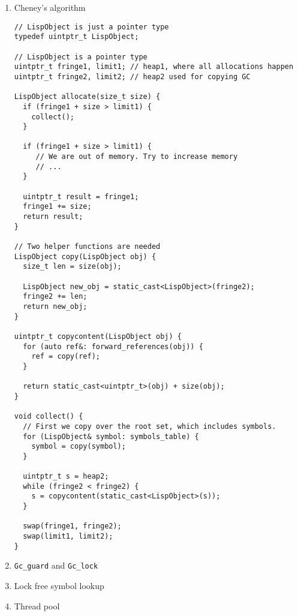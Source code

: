 \begin{enumerate}
\item Cheney's algorithm
\label{sec:org9d148aa}

\begin{verbatim}
// LispObject is just a pointer type
typedef uintptr_t LispObject;

// LispObject is a pointer type
uintptr_t fringe1, limit1; // heap1, where all allocations happen 
uintptr_t fringe2, limit2; // heap2 used for copying GC

LispObject allocate(size_t size) {
  if (fringe1 + size > limit1) {
    collect();
  }

  if (fringe1 + size > limit1) {
     // We are out of memory. Try to increase memory
     // ...
  }

  uintptr_t result = fringe1;
  fringe1 += size;
  return result;
}

// Two helper functions are needed
LispObject copy(LispObject obj) {
  size_t len = size(obj);

  LispObject new_obj = static_cast<LispObject>(fringe2);
  fringe2 += len;
  return new_obj;
}

uintptr_t copycontent(LispObject obj) {
  for (auto ref&: forward_references(obj)) {
    ref = copy(ref);
  }

  return static_cast<uintptr_t>(obj) + size(obj);
}

void collect() {
  // First we copy over the root set, which includes symbols.
  for (LispObject& symbol: symbols_table) {
    symbol = copy(symbol);
  }

  uintptr_t s = heap2;
  while (fringe2 < fringe2) {
    s = copycontent(static_cast<LispObject>(s));
  }

  swap(fringe1, fringe2);
  swap(limit1, limit2);
}
\end{verbatim}

\item \texttt{Gc\_guard} and \texttt{Gc\_lock}
\label{sec:orgc9a1d3d}
\item Lock free symbol lookup
\label{sec:org0a6de58}
\item Thread pool
\label{sec:org504fab0}
\end{enumerate}